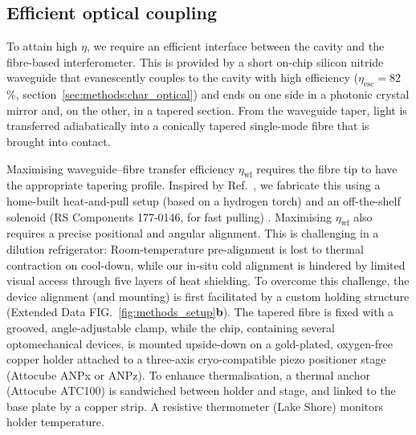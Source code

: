 \documentclass[./Main-revtex.tex]{subfiles}
\begin{document}
\subsection{Efficient optical coupling}
\label{sec:methods:optical_coupling}
To attain high $\eta$, we require an efficient interface between the cavity and the fibre-based interferometer. This is provided by a short on-chip silicon nitride waveguide that evanescently couples to the cavity with high efficiency ($\eta_\text{esc} = 82$\%, section~\ref{sec:methods:char_optical}) and ends on one side in a photonic crystal mirror and, on the other, in a tapered section. 
From the waveguide taper, light is transferred adiabatically into a conically tapered single-mode fibre that is brought into contact.

Maximising waveguide--fibre transfer efficiency $\eta_\text{wf}$ requires the fibre tip to have the appropriate tapering profile. Inspired by Ref.~\cite{tiecke2015efficient}, we fabricate this using a home-built heat-and-pull setup (based on a hydrogen torch) and an off-the-shelf solenoid (RS Components 177-0146, for fast pulling) \cite{khademi2024optomechanical}. Maximising $\eta_\text{wf}$ also requires a precise positional and angular alignment. This is challenging in a dilution refrigerator: Room-temperature pre-alignment is lost to thermal contraction on cool-down, while our in-situ cold alignment is hindered by limited visual access through five layers of heat shielding.
% 
To overcome this challenge, the device alignment (and mounting) is first facilitated by a custom holding structure (Extended Data FIG.~\ref{fig:methods_setup}\textbf{b}). The tapered fibre is fixed with a grooved, angle-adjustable clamp, while the chip, containing several optomechanical devices, is mounted upside-down on a gold-plated, oxygen-free copper holder attached to a three-axis cryo-compatible piezo positioner stage (Attocube ANPx or ANPz). To enhance thermalisation, a thermal anchor (Attocube ATC100) is sandwiched between holder and stage, and linked to the base plate by a copper strip. A resistive thermometer (Lake Shore) monitors holder temperature.
\end{document}
